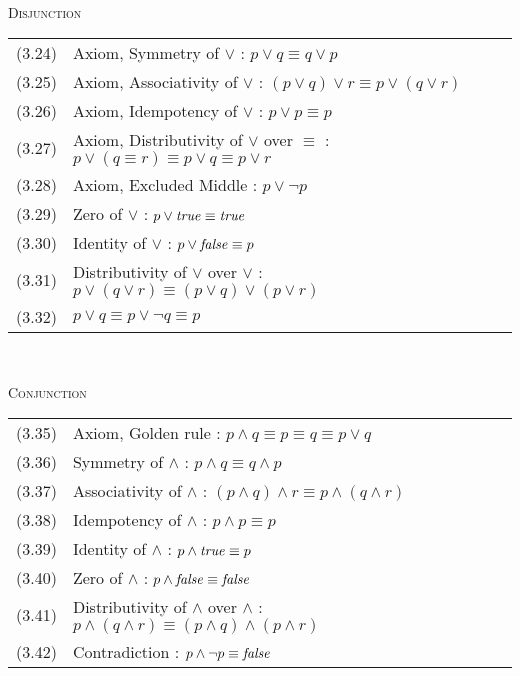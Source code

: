 \ \par

\textsc{Disjunction\\}

\begin{tabular}{ll}
(3.24) & Axiom, Symmetry of $\vee$ : $p\vee q \equiv  q \vee p$\\
(3.25) & Axiom, Associativity of  $\vee$  : $ (p\vee q) \vee r \equiv  p \vee (q \vee r)$\\
(3.26) & Axiom, Idempotency of $\vee$ : $p\vee p \equiv p$\\
(3.27) & Axiom, Distributivity of $\vee$ over $\equiv$ : $p \vee (q\equiv r) \equiv p\vee q \equiv p \vee r$\\
(3.28) & Axiom,  Excluded Middle : $p \vee \neg p $\\
(3.29) &  Zero of $\vee$ : $p \vee \mbox{\textit{true}} \equiv \mbox{\textit{true}}$\\
(3.30) &  Identity of $\vee$ : $p\vee \mbox{\textit{false}} \equiv  p$\\
(3.31) &  Distributivity of $\vee$ over $\vee$ : $p \vee (q\vee r) \equiv (p\vee q) \vee (p \vee r)$\\
(3.32) &  $p\vee q \equiv p \vee \neg q \equiv p $\\
\end{tabular}


\ \par

\textsc{Conjunction\\}

\begin{tabular}{lll}
(3.35) & Axiom, Golden rule : $p\wedge q \equiv  p \equiv q \equiv p \vee q$\\
(3.36) & Symmetry of  $\wedge$  : $ p\wedge q \equiv  q \wedge p$\\
(3.37) & Associativity of  $\wedge$  : $ (p\wedge q) \wedge r \equiv  p \wedge (q \wedge r)$\\
(3.38) & Idempotency of $\wedge$ : $p\wedge p \equiv p$\\
(3.39) & Identity of $\wedge$ : $p\wedge \mbox{\textit{true}} \equiv  p$\\
(3.40) & Zero of $\wedge$ : $p \wedge \mbox{\textit{false}} \equiv \mbox{\textit{false}}$\\
(3.41) & Distributivity of $\wedge$ over $\wedge$ : $p \wedge (q\wedge r) \equiv (p\wedge q) \wedge (p \wedge r)$\\
(3.42) & Contradiction : $p \wedge \neg p \equiv \mbox{\textit{false}}$\\
\end{tabular}

